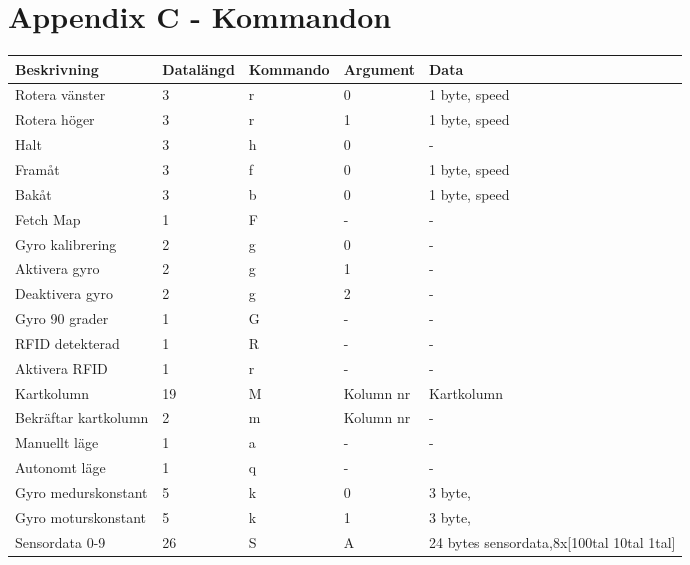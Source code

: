 \documentclass[a4paper,12pt,fleqn]{article}
\begin{document}
\section{Appendix C - Kommandon}

\begin{tabular}{| p{4cm} | p{2.5cm} | p{2.5cm} | p{2.5cm} | p{3.7cm} |}
	\hline
	\textbf{Beskrivning} & \textbf{Datalängd} & \textbf{Kommando} & \textbf{Argument} & \textbf{Data} \\ \hline
	Rotera vänster & 3 & r & 0 & 1 byte, speed \\\hline
	Rotera höger & 3 & r & 1 & 1 byte, speed \\\hline
	Halt & 3 & h & 0 & - \\\hline
	Framåt & 3 & f & 0 & 1 byte, speed \\\hline
	Bakåt & 3 & b & 0 & 1 byte, speed \\\hline
	Fetch Map & 1 & F & - & -\\\hline
	Gyro kalibrering & 2 & g & 0 & - \\\hline
	Aktivera gyro & 2 & g & 1 & - \\\hline
	Deaktivera gyro & 2 & g & 2 & - \\\hline

	Gyro 90 grader & 1 & G & - & - \\\hline
	RFID detekterad & 1 & R & - & - \\\hline
	Aktivera RFID & 1 & r & - & - \\\hline
	Kartkolumn & 19 & M & Kolumn nr& Kartkolumn\\\hline
	Bekräftar kartkolumn & 2 & m & Kolumn nr & - \\\hline
	Manuellt läge & 1 & a & - & - \\\hline
	Autonomt läge & 1 & q & - & - \\\hline
	Gyro medurskonstant & 5 & k & 0 & 3 byte,\newline [100tal 10tal 1tal]\\\hline
	Gyro moturskonstant & 5 & k & 1 & 3 byte,\newline [100tal 10tal 1tal]\\\hline
	Sensordata 0-9 & 26 & S & A & 24 bytes sensordata,\newline 8x[100tal 10tal 1tal]\\\hline
	
\end{tabular}
\end{document}
